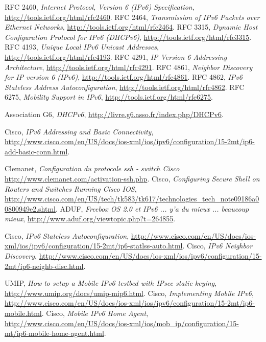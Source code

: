 \begin{thebibliography}{9}

  RFC 2460,
  \emph{Internet Protocol, Version 6 (IPv6) Specification},
  \url{http://tools.ietf.org/html/rfc2460}.
  RFC 2464,
  \emph{Transmission of IPv6 Packets over Ethernet Networks},
  \url{http://tools.ietf.org/html/rfc2464}.
  RFC 3315,
  \emph{Dynamic Host Configuration Protocol for IPv6 (DHCPv6)},
  \url{http://tools.ietf.org/html/rfc3315}.
  RFC 4193,
  \emph{Unique Local IPv6 Unicast Addresses},
  \url{http://tools.ietf.org/html/rfc4193}.
  RFC 4291,
  \emph{IP Version 6 Addressing Architecture},
  \url{http://tools.ietf.org/html/rfc4291}.
  RFC 4861,
  \emph{Neighbor Discovery for IP version 6 (IPv6)},
  \url{http://tools.ietf.org/html/rfc4861}.
  RFC 4862,
  \emph{IPv6 Stateless Address Autoconfiguration},
  \url{http://tools.ietf.org/html/rfc4862}.
  RFC 6275,
  \emph{Mobility Support in IPv6},
  \url{http://tools.ietf.org/html/rfc6275}.

  Association G6,
  \emph{DHCPv6},
  \url{http://livre.g6.asso.fr/index.php/DHCPv6}.

  Cisco,
  \emph{IPv6 Addressing and Basic Connectivity},
  \url{http://www.cisco.com/en/US/docs/ios-xml/ios/ipv6/configuration/15-2mt/ip6-add-basic-conn.html}.

  Clemanet,
  \emph{Configuration du protocole ssh - switch Cisco}
  \url{http://www.clemanet.com/activation-ssh.php}.
  Cisco,
  \emph{Configuring Secure Shell on Routers and Switches Running Cisco IOS},
  \url{http://www.cisco.com/en/US/tech/tk583/tk617/technologies_tech_note09186a00800949e2.shtml}.
  ADUF,
  \emph{Freebox OS 2.0 et IPv6 ... y'a du mieux ... beaucoup mieux},
  \url{http://www.aduf.org/viewtopic.php?t=264855}.

  Cisco,
  \emph{IPv6 Stateless Autoconfiguration},
  \url{http://www.cisco.com/en/US/docs/ios-xml/ios/ipv6/configuration/15-2mt/ip6-statlss-auto.html}.
  Cisco,
  \emph{IPv6 Neighbor Discovery},
  \url{http://www.cisco.com/en/US/docs/ios-xml/ios/ipv6/configuration/15-2mt/ip6-neighb-disc.html}.

  UMIP,
  \emph{How to setup a Mobile IPv6 testbed with IPsec static keying},
  \url{http://www.umip.org/docs/umip-mip6.html}.
  Cisco,
  \emph{Implementing Mobile IPv6},
  \url{http://www.cisco.com/en/US/docs/ios-xml/ios/ipv6/configuration/15-2mt/ip6-mobile.html}.
  Cisco,
  \emph{Mobile IPv6 Home Agent},
  \url{http://www.cisco.com/en/US/docs/ios-xml/ios/mob_ip/configuration/15-mt/ip6-mobile-home-agent.html}.


\end{thebibliography}
